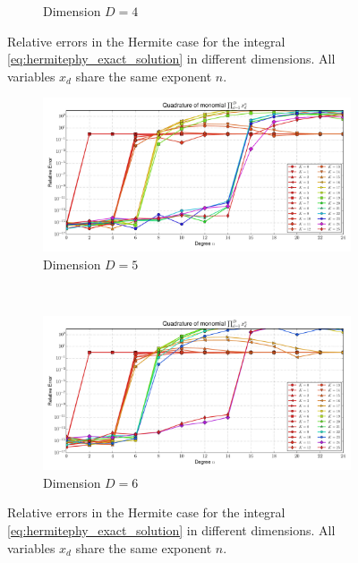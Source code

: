 \documentclass[a4paper,10pt]{article}
\begin{document}
\begin{figure}
\begin{subfigure}[b]{\linewidth}
    \caption{Dimension $D=4$}
    \label{fig:monomial_errors_hermitephy_multivariate_dimension_4}
  \end{subfigure}
  \caption{Relative errors in the Hermite case for the integral \eqref{eq:hermitephy_exact_solution}
    in different dimensions. All variables $x_d$ share the same exponent $n$.}
  \label{fig:monomial_errors_hermitephy_multivariate_a}
\end{figure}

\begin{figure}
  \begin{subfigure}[b]{\linewidth}
    \centering
    \includegraphics[width=\linewidth]{./img/monomial_errors_hermitephy_multivariate_dimension_5.pdf}
    \caption{Dimension $D=5$}
    \label{fig:monomial_errors_hermitephy_multivariate_dimension_5}
  \end{subfigure} \\
  \begin{subfigure}[b]{\linewidth}
    \centering
    \includegraphics[width=\linewidth]{./img/monomial_errors_hermitephy_multivariate_dimension_6.pdf}
    \caption{Dimension $D=6$}
    \label{fig:monomial_errors_hermitephy_multivariate_dimension_6}
  \end{subfigure}
  \caption{Relative errors in the Hermite case for the integral \eqref{eq:hermitephy_exact_solution}
    in different dimensions. All variables $x_d$ share the same exponent $n$.}
  \label{fig:monomial_errors_hermitephy_multivariate_b}
\end{figure}
\end{document}

